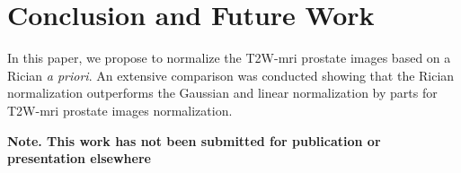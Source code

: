 \section{Conclusion and Future Work}
\label{sec:con}
In this paper, we propose to normalize the T2W-\ac{mri} prostate images based on a Rician \textit{a priori}.
An extensive comparison was conducted showing that the Rician normalization outperforms the Gaussian and linear normalization by parts for T2W-\ac{mri} prostate images normalization.

\textbf{Note. This work has not been submitted for publication or presentation elsewhere}

